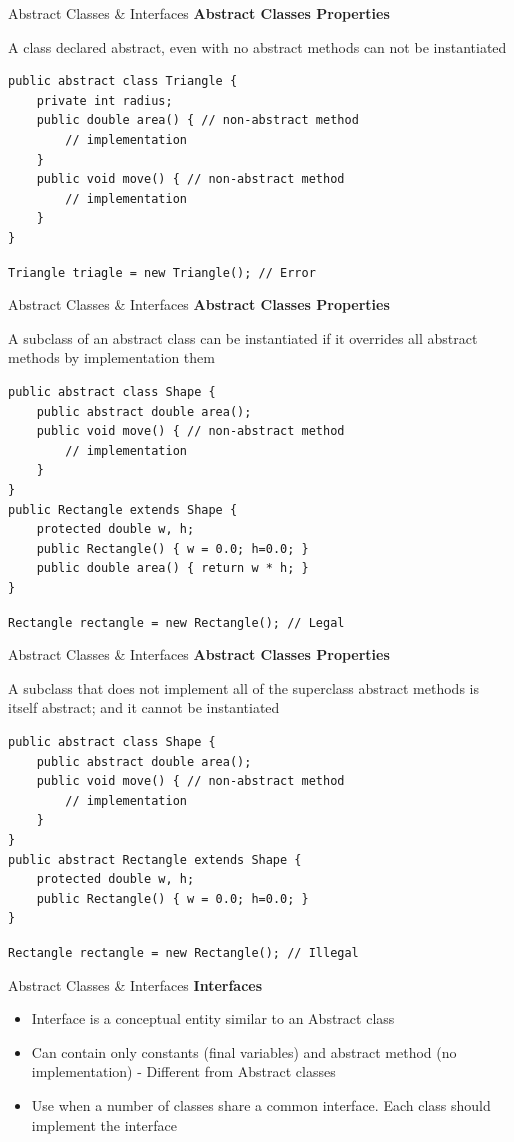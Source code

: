 \documentclass[14pt]{beamer}
\begin{document}
\begin{frame}[fragile]{Abstract Classes \& Interfaces}
 \textbf{Abstract Classes Properties}
 
 A class declared abstract, even with no abstract methods can not be instantiated
 \begin{lstlisting}[numbers=none,  basicstyle=\tiny, frame = single]
public abstract class Triangle {
    private int radius;
    public double area() { // non-abstract method
        // implementation
    } 
    public void move() { // non-abstract method
        // implementation
    }
}
\end{lstlisting}
\lstinline!Triangle triagle = new Triangle(); // Error!
\end{frame}

\begin{frame}[fragile]{Abstract Classes \& Interfaces}
 \textbf{Abstract Classes Properties}
 
 A subclass of an abstract class can be instantiated if it overrides all abstract methods by implementation them
 \begin{lstlisting}[numbers=none,  basicstyle=\tiny, frame = single]
  public abstract class Shape {
    public abstract double area(); 
    public void move() { // non-abstract method
        // implementation
    }
}
public Rectangle extends Shape {
    protected double w, h;
    public Rectangle() { w = 0.0; h=0.0; }
    public double area() { return w * h; }
}
 \end{lstlisting}
\lstinline!Rectangle rectangle = new Rectangle(); // Legal!
\end{frame}


\begin{frame}[fragile]{Abstract Classes \& Interfaces}
 \textbf{Abstract Classes Properties}
 
 A subclass that does not implement all of the superclass abstract methods is itself abstract; and it cannot be instantiated
 \begin{lstlisting}[numbers=none,  basicstyle=\tiny, frame = single]
  public abstract class Shape {
    public abstract double area(); 
    public void move() { // non-abstract method
        // implementation
    }
}
public abstract Rectangle extends Shape {
    protected double w, h;
    public Rectangle() { w = 0.0; h=0.0; }
}
 \end{lstlisting}
\lstinline!Rectangle rectangle = new Rectangle(); // Illegal!
\end{frame}

\begin{frame}{Abstract Classes \& Interfaces}
 \textbf{Interfaces}
 \begin{itemize}
  \item Interface  is a  conceptual entity similar to an Abstract class
  \item Can contain only constants (final variables) and abstract method (no implementation) - Different from Abstract classes
  \item Use when a  number of classes share a common interface. Each class should implement the interface
 \end{itemize}
\end{frame}
\end{document}
